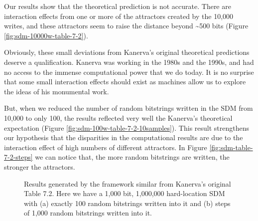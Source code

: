 Our results show that the theoretical prediction is not accurate.  There are interaction effects from one or more of the attractors created by the 10,000 writes, and these attractors seem to raise the distance beyond \textasciitilde 500 bits (Figure \ref{fig:sdm-10000w-table-7-2}).

Obviously, these small deviations from Kanerva's original theoretical predictions deserve a qualification.  Kanerva was working in the 1980s and the 1990s, and had no access to the immense computational power that we do today. It is no surprise that some small interaction effects should exist as machines allow us to explore the ideas of his monumental work.

But, when we reduced the number of random bitstrings written in the SDM from 10,000 to only 100, the results reflected very well the Kanerva's theoretical expectation (Figure \ref{fig:sdm-100w-table-7-2-10samples}). This result strengthens our hypothesis that the disparities in the computational results are due to the interaction effect of high numbers of different attractors. In Figure \ref{fig:sdm-table-7-2-steps} we can notice that, the more random bitstrings are written, the stronger the attractors.

\begin{figure}[h]
\centering
{}

\caption{Results generated by the framework similar from Kanerva's original Table 7.2. Here we have a 1,000 bit, 1,000,000 hard-location SDM with (a) exactly 100 random bitstrings written into it and (b) steps of 1,000 random bitstrings written into it.
\label{fig:sdm-100w-table-7-2}}
\end{figure}

